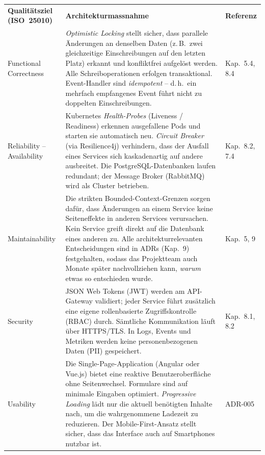 
\begin{tabularx}{\textwidth}{L{4cm} X L{2cm}}
  \color{white}\textbf{Qualitätsziel (ISO~25010)} &
  \color{white}\textbf{Architekturmassnahme} &
  \color{white}\textbf{Referenz} \\

  Functional Correctness &
  \emph{Optimistic Locking} stellt sicher, dass parallele
  Änderungen an denselben Daten (z.\,B.\ zwei gleichzeitige
  Einschreibungen auf den letzten Platz) erkannt und
  konfliktfrei aufgelöst werden. Alle Schreiboperationen
  erfolgen transaktional. Event-Handler sind
  \emph{idempotent} -- d.\,h.\ ein mehrfach empfangenes
  Event führt nicht zu doppelten Einschreibungen. &
  Kap.~5.4, 8.4 \\

  Reliability -- Availability &
  Kubernetes \emph{Health-Probes} (Liveness / Readiness)
  erkennen ausgefallene Pods und starten sie automatisch
  neu. \emph{Circuit Breaker} (via Resilience4j) verhindern,
  dass der Ausfall eines Services sich kaskadenartig auf
  andere ausbreitet. Die PostgreSQL-Datenbanken laufen
  redundant; der Message Broker (RabbitMQ) wird als Cluster
  betrieben. &
  Kap.~8.2, 7.4 \\

  Maintainability &
  Die strikten Bounded-Context-Grenzen sorgen dafür, dass
  Änderungen an einem Service keine Seiteneffekte in
  anderen Services verursachen. Kein Service greift direkt
  auf die Datenbank eines anderen zu. Alle architekturrelevanten
  Entscheidungen sind in ADRs (Kap.~9) festgehalten, sodass
  das Projektteam auch Monate später nachvollziehen kann,
  \emph{warum} etwas so entschieden wurde. &
  Kap.~5, 9 \\

  Security &
  JSON Web Tokens (JWT) werden am API-Gateway validiert;
  jeder Service führt zusätzlich eine eigene rollenbasierte
  Zugriffskontrolle (RBAC) durch. Sämtliche Kommunikation
  läuft über HTTPS/TLS. In Logs, Events und Metriken werden
  keine personenbezogenen Daten (PII) gespeichert. &
  Kap.~8.1, 8.2 \\

  Usability &
  Die Single-Page-Application (Angular oder Vue.js) bietet
  eine reaktive Benutzeroberfläche ohne Seitenwechsel.
  Formulare sind auf minimale Eingaben optimiert.
  \emph{Progressive Loading} lädt nur die aktuell benötigten
  Inhalte nach, um die wahrgenommene Ladezeit zu reduzieren.
  Der Mobile-First-Ansatz stellt sicher, dass das Interface
  auch auf Smartphones nutzbar ist. &
  ADR-005 \\
\end{tabularx}

